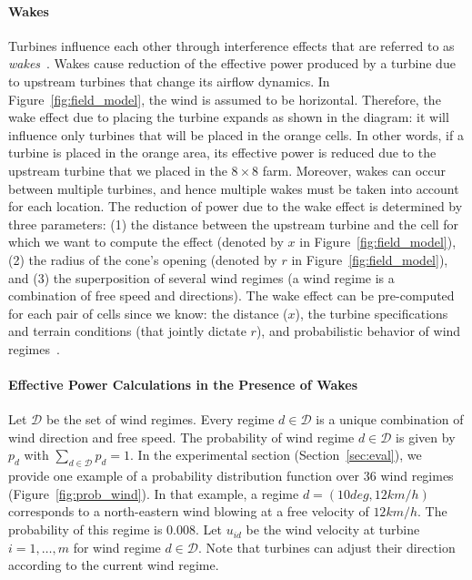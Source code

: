 \documentclass[preprint,12pt]{elsarticle}
\begin{document}
\paragraph{Wakes} Turbines influence each other through interference effects that are referred to as \emph{wakes}~\cite{jensen1983note,shakoor2016wake}. 
	 Wakes cause reduction of the effective power produced by a turbine due to upstream turbines that change
	 its airflow dynamics. In Figure~\ref{fig:field_model}, the wind is assumed to be horizontal. Therefore, the wake effect due
	 to placing the turbine expands as shown in the diagram: it will influence only turbines that will be placed in the orange cells.
	 In other words, if a turbine is placed in the orange area, its effective
	 power is reduced due to the upstream turbine that we placed in the $8\times8$ farm. 
	 Moreover, wakes can occur between multiple turbines, and hence
	 multiple wakes must be taken into account for each location. 
	 The reduction of power due to the wake effect is determined by three parameters: (1) the distance between the upstream
	 turbine and the cell for which we want to compute the effect (denoted by $x$ in Figure~\ref{fig:field_model}), (2) the radius of the cone's opening 
	 (denoted by $r$ in Figure~\ref{fig:field_model}), and (3) 
	 the superposition of several wind regimes (a wind regime is a combination of free speed and directions).
	 The wake effect can be pre-computed for each pair of cells 
	 since we know: the distance ($x$), the turbine specifications and terrain conditions (that jointly dictate $r$), and  
	 probabilistic behavior of wind regimes~\cite{Zhang2014}. 
	 
\paragraph{Effective Power Calculations in the Presence of Wakes} 
Let $\mathcal{D}$ be the set of wind regimes. Every regime $d\in \mathcal{D}$ is a unique combination of wind direction and free speed. 
The probability of wind regime 
$d \in \mathcal{D}$ is given by $p_d$ with $\sum_{d \in \mathcal{D}}^{} p_d = 1$. In the experimental section (Section~\ref{sec:eval}),
we provide one example of a probability distribution 
function over $36$ wind regimes (Figure~\ref{fig:prob_wind}). In that example, 
a regime $d=(10deg, 12km/h)$ corresponds to a north-eastern wind blowing at a free velocity of $12km/h$. The
probability of this regime is $0.008$. Let $u_{id}$ be the wind velocity at turbine $i = 1,\ldots, m$ for wind regime $d\in\mathcal{D}$. 
Note that turbines can adjust their direction according to the current wind 
regime. 
\end{document}
